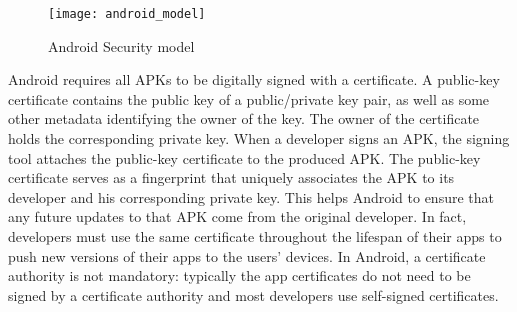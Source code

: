 \begin{figure}[H]
\centering
\texttt{[image: android\_model]}
\caption{Android Security model}
\label{fig:androidmodel}
\end{figure}



Android requires  all APKs to be digitally signed with a certificate. A public-key certificate contains the public key of a public/private key pair, as well as some other metadata identifying the owner of the key. The owner of the certificate holds the corresponding private key. When a developer signs an APK, the signing tool attaches the public-key certificate to the produced APK. The public-key certificate serves as a fingerprint that uniquely associates the APK to its developer and his corresponding private key. This helps Android to ensure that any future updates to that APK  come from the original developer. In fact, developers must use the same certificate throughout the lifespan of their apps to push new versions of their apps to the users' devices. In Android, a certificate authority is not mandatory: typically the app certificates do not need to be signed by a certificate authority and most developers use self-signed certificates.



